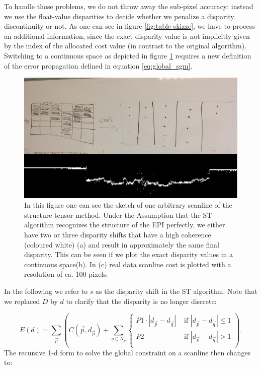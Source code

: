 \documentclass  [
  paper    = a4,
  BCOR     = 10mm,
  twoside,
  fontsize = 12pt,
  fleqn,
  toc      = bibnumbered,
  toc      = listofnumbered,
  numbers  = noendperiod,
  headings = normal,
  listof   = leveldown,
  version  = 3.03
]                                       {scrreprt}
\begin{document}
To handle those problems, we do not throw away the sub-pixel accuracy: instead we use the float-value disparities to decide whether we penalize a disparity discontinuity or not. As one can see in figure \ref{fig:table-skizze}, we have to process an additional information, since the exact disparity value is not implicitly given by the index of the allocated cost value (in contrast to the original algorithm). Switching to a continuous space as depicted in figure \ref{fig:discretecont} requires a new definition of the error propagation defined in equation \ref{eq:global_sgm}.
\begin{figure}
	\centering
	\includegraphics[width=0.7\linewidth]{images/discrete_cont}
	\caption[Discrete scanline to continuous scanline]{In this figure one can see the sketch of one arbitrary scanline of the structure tensor method. Under the Assumption that the ST algorithm recognizes the structure of the EPI perfectly, we either have two or three disparity shifts that have a high coherence (coloured white) (a) and result in approximately the same final disparity. This can be seen if we plot the exact disparity values in a continuous space(b). In (c) real data scanline cost is plotted with a resolution of ca. 100 pixels.}
	\label{fig:discretecont}
\end{figure}


 In the following we refer to $s$ as the disparity shift in the ST algorithm. Note that we replaced $D$ by $d$ to clarify that the disparity is no longer discrete:

\begin{equation}\label{eq:global_sgm_cont}
E(d) = \sum_{\vec p} \left(C(\vec{p}, d_{\vec p}) + \sum_{q\in N_p} 
\begin{cases}
P1\cdot |d_{\vec p} - d_{\vec q}|  & \text{ if }|d_{\vec p} - d_{\vec q}| \leq 1\\
P2 & \text{ if }|d_{\vec p} - d_{\vec q}| > 1\\
\end{cases}  
\right).
\end{equation}
The recursive 1-d form to solve the global constraint on a scanline then changes to:
\end{document}
